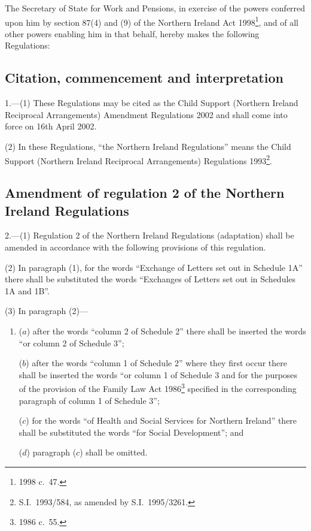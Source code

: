 \documentclass[12pt,a4paper]{article}
\title{\regstitle}
\author{S.I.\ 2002 No.\ 771}
\date{Made
21st March 2002\\
Laid before Parliament
26th March 2002\\
Coming into force
16th April 2002
}
\begin{document}
\maketitle

\noindent
The Secretary of State for Work and Pensions, in exercise of the powers conferred upon him by section 87(4) and (9) of the Northern Ireland Act 1998\footnote{1998 c.\ 47.}, and of all other powers enabling him in that behalf, hereby makes the following Regulations: 

{\sloppy

\tableofcontents

}

\bigskip

\setcounter{secnumdepth}{-2}

\subsection[1. Citation, commencement and interpretation]{Citation, commencement and interpretation}

1.---(1)  These Regulations may be cited as the Child Support (Northern Ireland Reciprocal Arrangements) Amendment Regulations 2002 and shall come into force on 16th April 2002.

(2) In these Regulations, “the Northern Ireland Regulations” means the Child Support (Northern Ireland Reciprocal Arrangements) Regulations 1993\footnote{S.I.\ 1993/584, as amended by S.I.\ 1995/3261.}.

\subsection[2. Amendment of regulation 2 of the Northern Ireland Regulations]{Amendment of regulation 2 of the Northern Ireland Regulations}

2.---(1)  Regulation 2 of the Northern Ireland Regulations (adaptation) shall be amended in accordance with the following provisions of this regulation.

(2) In paragraph (1), for the words “Exchange of Letters set out in Schedule 1A” there shall be substituted the words “Exchanges of Letters set out in Schedules 1A and 1B”.

(3) In paragraph (2)—
\begin{enumerate}\item[]
($a$) after the words “column 2 of Schedule 2” there shall be inserted the words “or column 2 of Schedule 3”;

($b$) after the words “column 1 of Schedule 2” where they first occur there shall be inserted the words “or column 1 of Schedule 3 and for the purposes of the provision of the Family Law Act 1986\footnote{1986 c.\ 55.} specified in the corresponding paragraph of column 1 of Schedule 3”;

($c$) for the words “of Health and Social Services for Northern Ireland” there shall be substituted the words “for Social Development”; and

($d$) paragraph ($c$)  shall be omitted.
\end{enumerate}
\end{document}
